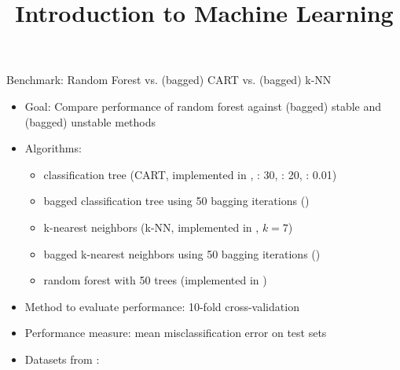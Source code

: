 \documentclass[11pt,compress,t,notes=noshow, xcolor=table]{beamer}
\title{Introduction to Machine Learning}
\begin{document}


\begin{vbframe}{Benchmark: Random Forest vs. (bagged) CART vs. (bagged) k-NN}

  \begin{itemize}
    \item Goal: Compare performance of random forest against (bagged) stable and (bagged) unstable methods
    \item Algorithms:
    \begin{itemize}
      \item classification tree (CART, implemented in , : 30, : 20, : 0.01)
      \item bagged classification tree using 50 bagging iterations ()
      \item k-nearest neighbors (k-NN, implemented in , $k=7$)
      \item bagged k-nearest neighbors using 50 bagging iterations ()
      \item random forest with 50 trees (implemented in )
    \end{itemize}
    \item Method to evaluate performance: 10-fold cross-validation
    \item Performance measure: mean misclassification error on test sets
    \end{itemize}

    \framebreak

    \begin{itemize}
    \item Datasets from :
    \end{itemize}


\end{vbframe}
\end{document}
